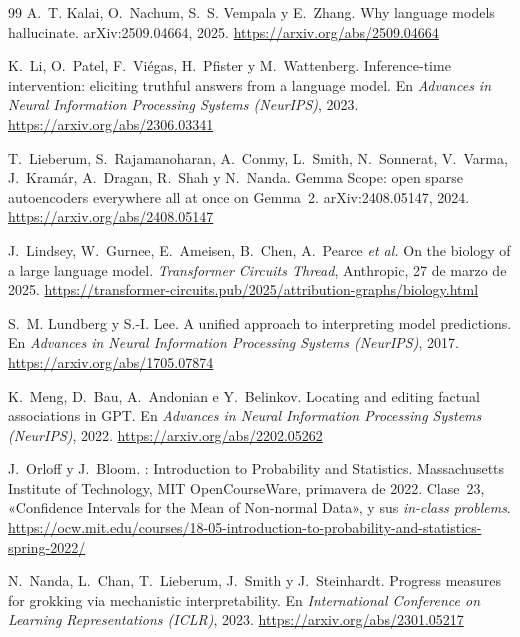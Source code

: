 \begin{thebibliography}{99}
A.~T. Kalai, O.~Nachum, S.~S. Vempala y E.~Zhang.
\newblock Why language models hallucinate.
\newblock arXiv:2509.04664, 2025.
\newblock \url{https://arxiv.org/abs/2509.04664}

K.~Li, O.~Patel, F.~Viégas, H.~Pfister y M.~Wattenberg.
\newblock Inference-time intervention: eliciting truthful answers from a language model.
\newblock En \emph{Advances in Neural Information Processing Systems (NeurIPS)}, 2023.
\newblock \url{https://arxiv.org/abs/2306.03341}

T.~Lieberum, S.~Rajamanoharan, A.~Conmy, L.~Smith, N.~Sonnerat, V.~Varma, J.~Kramár, A.~Dragan, R.~Shah y N.~Nanda.
\newblock Gemma Scope: open sparse autoencoders everywhere all at once on Gemma~2.
\newblock arXiv:2408.05147, 2024.
\newblock \url{https://arxiv.org/abs/2408.05147}

J.~Lindsey, W.~Gurnee, E.~Ameisen, B.~Chen, A.~Pearce \emph{et al.}
\newblock On the biology of a large language model.
\newblock \emph{Transformer Circuits Thread}, Anthropic, 27 de marzo de 2025.
\newblock \url{https://transformer-circuits.pub/2025/attribution-graphs/biology.html}

S.~M. Lundberg y S.-I. Lee.
\newblock A unified approach to interpreting model predictions.
\newblock En \emph{Advances in Neural Information Processing Systems (NeurIPS)}, 2017.
\newblock \url{https://arxiv.org/abs/1705.07874}

K.~Meng, D.~Bau, A.~Andonian e Y.~Belinkov.
\newblock Locating and editing factual associations in GPT.
\newblock En \emph{Advances in Neural Information Processing Systems (NeurIPS)}, 2022.
\newblock \url{https://arxiv.org/abs/2202.05262}

J.~Orloff y J.~Bloom.
: Introduction to Probability and Statistics.
\newblock Massachusetts Institute of Technology, MIT OpenCourseWare, primavera de 2022. Clase~23, «Confidence Intervals for the Mean of Non-normal Data», y sus \emph{in-class problems}.
\newblock \url{https://ocw.mit.edu/courses/18-05-introduction-to-probability-and-statistics-spring-2022/}

N.~Nanda, L.~Chan, T.~Lieberum, J.~Smith y J.~Steinhardt.
\newblock Progress measures for grokking via mechanistic interpretability.
\newblock En \emph{International Conference on Learning Representations (ICLR)}, 2023.
\newblock \url{https://arxiv.org/abs/2301.05217}


\end{thebibliography}
